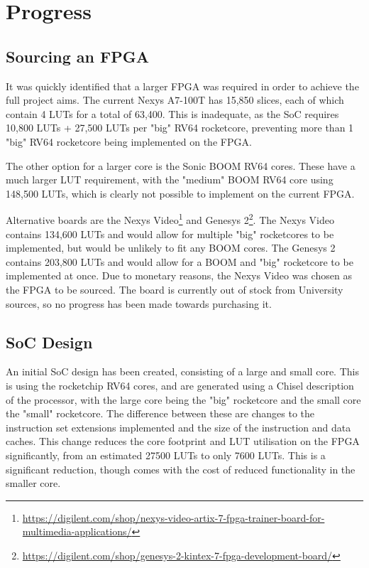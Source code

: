 \section{Progress}
\label{sec:progress}
\subsection{Sourcing an FPGA}
It was quickly identified that a larger FPGA was required in order to achieve the full project aims. The current Nexys A7-100T\cite{nexys-a7-100t} has 15,850 slices, each of which contain 4 LUTs for a total of 63,400. This is inadequate, as the SoC requires 10,800 LUTs + 27,500 LUTs per "big" RV64 rocketcore, preventing more than 1 "big" RV64 rocketcore being implemented on the FPGA.

The other option for a larger core is the Sonic BOOM RV64 cores. These have a much larger LUT requirement, with the "medium" BOOM\cite{boom-core} RV64 core using 148,500 LUTs, which is clearly not possible to implement on the current FPGA.

Alternative boards are the Nexys Video\footnote{\url{https://digilent.com/shop/nexys-video-artix-7-fpga-trainer-board-for-multimedia-applications/}} and Genesys 2\footnote{\url{https://digilent.com/shop/genesys-2-kintex-7-fpga-development-board/}}. The Nexys Video contains 134,600 LUTs and would allow for multiple "big" rocketcores to be implemented, but would be unlikely to fit any BOOM cores. The Genesys 2 contains 203,800 LUTs and would allow for a BOOM and "big" rocketcore to be implemented at once. Due to monetary reasons, the Nexys Video was chosen as the FPGA to be sourced. The board is currently out of stock from University sources, so no progress has been made towards purchasing it.

\subsection{SoC Design}
An initial SoC design has been created, consisting of a large and small core. This is using the rocketchip\cite{rocketchip} RV64 cores, and are generated using a Chisel description of the processor, with the large core being the "big" rocketcore and the small core the "small" rocketcore. The difference between these are changes to the instruction set extensions implemented and the size of the instruction and data caches. This change reduces the core footprint and LUT utilisation on the FPGA significantly, from an estimated 27500 LUTs to only 7600 LUTs. This is a significant reduction, though comes with the cost of reduced functionality in the smaller core.


